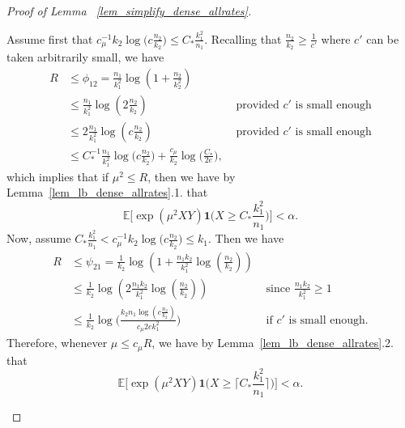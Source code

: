 \documentclass{article}
\newcommand{\EE}{\mathbb{E}}
\newcommand{\one}{\mathbf{1}}
\newcommand{\Ct}{C_{*}}
\begin{document}
\begin{proof}[Proof of Lemma ~\ref{lem_simplify_dense_allrates}]
\begin{enumerate}
    Assume first that $c_\mu^{-1}k_2\log\big(c\frac{n_2}{k_2}\big) \leq \Ct \frac{k_1^2}{n_1}$. 
    Recalling that $\frac{n_2}{k_2}\geq \frac{1}{c'}$ where $c'$ can be taken arbitrarily small, we have
    \begin{align*}
        R &\leq \phi_{12} = \frac{n_1}{k_1^2} \log\left(1+\frac{n_2}{k_2^2}\right) &\\
        & \leq \frac{n_1}{k_1^2} \log\left(2\frac{n_2}{k_2}\right) & \text{ provided $c'$ is small enough}\\
        & \leq 2\frac{n_1}{k_1^2} \log\left(c\frac{n_2}{k_2}\right) &\text{ provided $c'$ is small enough}\\
        &\leq \Ct^{-1}\frac{n_1}{k_1^2}\log\Big(c \frac{n_2}{k_2}\Big) + \frac{c_\mu}{k_2}\log\Big(\frac{\Ct}{2e}\Big),&
    \end{align*}
    which implies that if $\mu^2 \leq R$, then we have by Lemma~\ref{lem_lb_dense_allrates}.1. that 
    \[\EE\Big[\exp(\mu^2XY)\one\big(X \geq  \Ct \frac{k_1^2}{n_1} \big)\Big] < \alpha.\]
    Now, assume $\Ct \frac{k_1^2}{n_1} < c_\mu^{-1}k_2\log\big(c\frac{n_2}{k_2}\big) \leq k_1$. 
    Then we have 
    \begin{align*}
        R &\leq \psi_{21} = \frac{1}{k_2} \log\left( 1+ \frac{n_1k_2}{k_1^2} \log\left(\frac{n_2}{k_2}\right)\right)&\\
        & \leq \frac{1}{k_2} \log\left( 2\frac{n_1k_2}{k_1^2} \log\left(\frac{n_2}{k_2}\right)\right) & \text{ since } \frac{n_1k_2}{k_1^2} \geq 1\\
        &\leq \frac{1}{k_2}\log\Big(\frac{k_2n_1\log(c \frac{n_2}{k_2})}{c_\mu 2e k_1^2}\Big) &\text{ if $c'$ is small enough.}
    \end{align*}
    Therefore, whenever $\mu \leq c_\mu R$, we have by Lemma~\ref{lem_lb_dense_allrates}.2. that
    \[\EE\Big[\exp(\mu^2XY)\one\big(X \geq \lceil  \Ct \frac{k_1^2}{n_1}\rceil\big)\Big] < \alpha.\]


\end{enumerate}
\end{proof}
\end{document}
